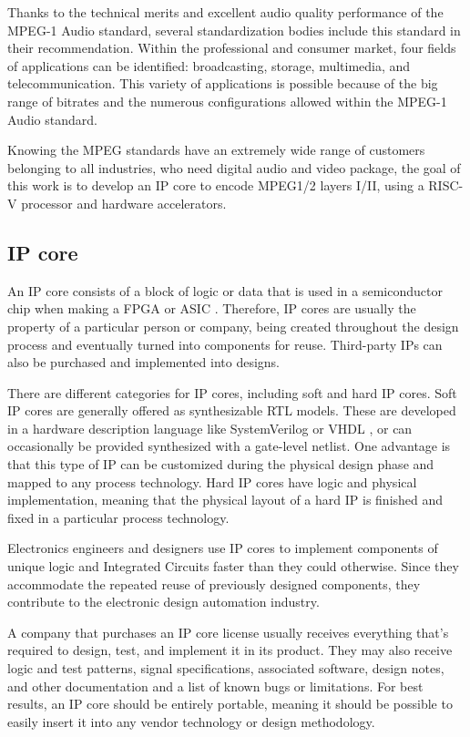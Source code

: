 Thanks to the technical merits and excellent audio quality performance of the MPEG-1 Audio standard, several standardization bodies include this standard in their recommendation.
Within the professional and consumer market, four fields of applications can be identified: broadcasting, storage, multimedia, and telecommunication. This variety of applications is possible because of the big range of bitrates and the numerous configurations allowed within the MPEG-1 Audio standard. 

Knowing the MPEG standards have an extremely wide range of customers belonging to all industries, who need digital audio and video package, the goal of this work is to develop an IP core to encode MPEG1/2 layers I/II, using a RISC-V processor and hardware accelerators.

\subsection{IP core}

An IP core consists of a block of logic or data that is used in a semiconductor chip when making a FPGA \cite{fpga} or ASIC \cite{asic}.
Therefore, IP cores are usually the property of a particular person or company, being created throughout the design process and eventually turned into components for reuse. Third-party IPs can also be purchased and implemented into designs. 

There are different categories for IP cores, including soft and hard IP cores.
Soft IP cores are generally offered as synthesizable RTL models. These are developed in a hardware description language like SystemVerilog \cite{ieee:systemVerilog} or VHDL \cite{ieee:vhdl}, or can occasionally be provided synthesized with a gate-level netlist. One advantage is that this type of IP can be customized during the physical design phase and mapped to any process technology.
Hard IP cores have logic and physical implementation, meaning that the physical layout of a hard IP is finished and fixed in a particular process technology.

Electronics engineers and designers use IP cores to implement components of unique logic and Integrated Circuits faster than they could otherwise. Since they accommodate the repeated reuse of previously designed components, they contribute to the electronic design automation industry.

A company that purchases an IP core license usually receives everything that's required to design, test, and implement it in its product. They may also receive logic and test patterns, signal specifications, associated software, design notes, and other documentation and a list of known bugs or limitations.
For best results, an IP core should be entirely portable, meaning it should be possible to easily insert it into any vendor technology or design methodology.

